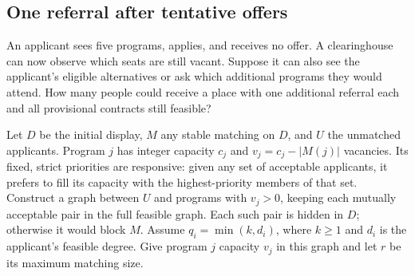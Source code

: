\subsection{One referral after tentative offers}\label{sec:residualreferral}
An applicant sees five programs, applies, and receives no offer. A clearinghouse can now observe which seats are still vacant. Suppose it can also see the applicant's eligible alternatives or ask which additional programs they would attend. How many people could receive a place with one additional referral each and all provisional contracts still feasible?

Let $D$ be the initial display, $M$ any stable matching on $D$, and $U$ the unmatched applicants. Program $j$ has integer capacity $c_j$ and $v_j=c_j-|M(j)|$ vacancies. Its fixed, strict priorities are responsive: given any set of acceptable applicants, it prefers to fill its capacity with the highest-priority members of that set. Construct a graph between $U$ and programs with $v_j>0$, keeping each mutually acceptable pair in the full feasible graph. Each such pair is hidden in $D$; otherwise it would block $M$. Assume $q_i=\min(k,d_i)$, where $k\ge1$ and $d_i$ is the applicant's feasible degree. Give program $j$ capacity $v_j$ in this graph and let $r$ be its maximum matching size.

